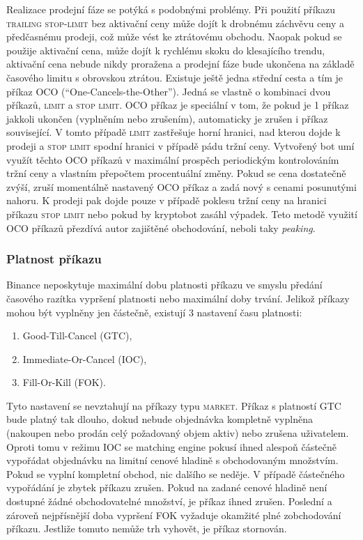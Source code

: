 Realizace prodejní fáze se potýká s podobnými problémy. Při použití příkazu \textsc{trailing stop-limit} bez aktivační ceny může dojít k drobnému záchvěvu ceny a předčasnému prodeji, což může
vést ke ztrátovému obchodu. Naopak pokud se použije aktivační cena, může dojít k rychlému skoku do klesajícího trendu, aktivační cena nebude nikdy proražena a prodejní fáze bude ukončena na základě
časového limitu s obrovskou ztrátou. Existuje ještě jedna střední cesta a tím je příkaz \textsc{OCO} (\enquote{One-Cancels-the-Other}). Jedná se vlastně o kombinaci dvou příkazů, \textsc{limit} a
\textsc{stop limit}. \textsc{OCO} příkaz je speciální v tom, že pokud je 1 příkaz jakkoli ukončen (vyplněním nebo zrušením), automaticky je zrušen i příkaz související.
V tomto případě \textsc{limit} zastřešuje horní hranici, nad
kterou dojde k prodeji a \textsc{stop limit} spodní hranici v případě pádu tržní ceny. Vytvořený bot umí využít těchto \textsc{OCO} příkazů v maximální prospěch periodickým kontrolováním tržní ceny
a vlastním přepočtem procentuální změny. Pokud se cena dostatečně zvýší, zruší momentálně nastavený \textsc{OCO} příkaz a zadá nový s cenami posunutými nahoru. K prodeji pak dojde pouze v případě poklesu tržní
ceny na hranici příkazu \textsc{stop limit} nebo pokud by kryptobot zasáhl výpadek. Teto metodě využití \textsc{OCO} příkazů přezdívá autor zajištěné obchodování, neboli taky \emph{peaking}.

\subsubsection{Platnost příkazu}
Binance neposkytuje maximální dobu platnosti příkazu ve smyslu předání časového razítka vypršení platnosti nebo maximální doby trvání. Jelikož příkazy mohou být vyplněny jen částečně, existují
3 nastavení času platnosti:
\begin{enumerate}
    \item Good-Till-Cancel (GTC),
    \item Immediate-Or-Cancel (IOC),
    \item Fill-Or-Kill (FOK).
\end{enumerate}
Tyto nastavení se nevztahují na příkazy typu \textsc{market}. Příkaz s platností GTC bude platný tak dlouho, dokud nebude objednávka kompletně vyplněna (nakoupen nebo prodán celý požadovaný objem aktiv)
nebo zrušena uživatelem. Oproti tomu v
režimu IOC se matching engine pokusí ihned alespoň částečně vypořádat objednávku na limitní cenové hladině s obchodovaným množstvím. Pokud se vyplní kompletní obchod, nic dalšího
se neděje. V případě částečného vypořádání je zbytek příkazu zrušen. Pokud na zadané cenové hladině není dostupné žádné obchodovatelné množství, je příkaz ihned zrušen.
Poslední a zároveň nejpřísnější doba vypršení FOK vyžaduje okamžité plné zobchodování příkazu. Jestliže tomuto nemůže trh vyhovět, je příkaz stornován.

